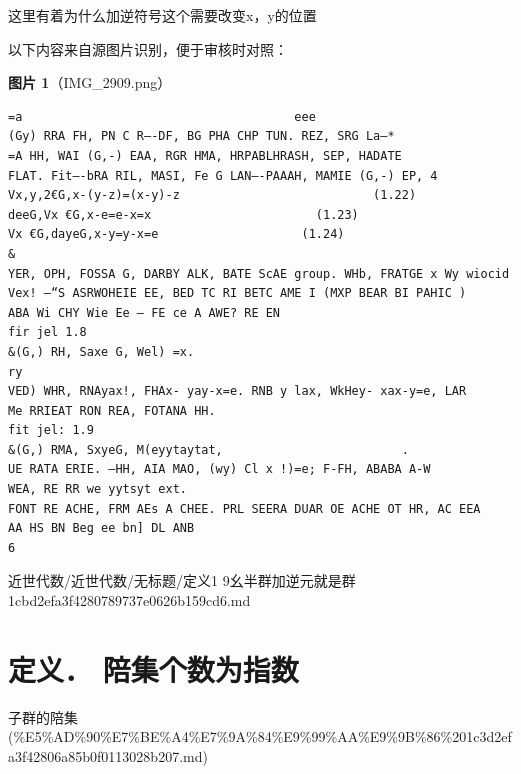 \begin{definition}[定义1.9幺半群加逆元就是群]

这里有着为什么加逆符号这个需要改变x，y的位置

\end{definition}

\begin{note}
以下内容来自源图片识别，便于审核时对照：

\textbf{图片 1}（IMG\_2909.png）
\begin{Verbatim}[fontsize=\small]
=a                                      eee
(Gy) RRA FH, PN C R—-DF, BG PHA CHP TUN. REZ, SRG La—*
=A HH, WAI (G,-) EAA, RGR HMA, HRPABLHRASH, SEP, HADATE
FLAT. Fit—-bRA RIL, MASI, Fe G LAN—-PAAAH, MAMIE (G,-) EP, 4
Vx,y,2€G,x-(y-z)=(x-y)-z                           (1.22)
deeG,Vx €G,x-e=e-x=x                       (1.23)
Vx €G,dayeG,x-y=y-x=e                    (1.24)
&
YER, OPH, FOSSA G, DARBY ALK, BATE ScAE group. WHb, FRATGE x Wy wiocid
Vex! —“S ASRWOHEIE EE, BED TC RI BETC AME I (MXP BEAR BI PAHIC )
ABA Wi CHY Wie Ee — FE ce A AWE? RE EN
fir jel 1.8
&(G,) RH, Saxe G, Wel) =x.
ry
VED) WHR, RNAyax!, FHAx- yay-x=e. RNB y lax, WkHey- xax-y=e, LAR
Me RRIEAT RON REA, FOTANA HH.
fit jel: 1.9
&(G,) RMA, SxyeG, M(eyytaytat,                         .
UE RATA ERIE. —HH, AIA MAO, (wy) Cl x !)=e; F-FH, ABABA A-W
WEA, RE RR we yytsyt ext.
FONT RE ACHE, FRM AEs A CHEE. PRL SEERA DUAR OE ACHE OT HR, AC EEA
AA HS BN Beg ee bn] DL ANB
6
\end{Verbatim}

\end{note}

\begin{note}[来源路径]

近世代数/近世代数/无标题/定义1 9幺半群加逆元就是群 1cbd2efa3f4280789737e0626b159cd6.md

\end{note}

\section*{定义． 陪集个数为指数}

\begin{note}[来源上级主题]

子群的陪集 (\%E5\%AD\%90\%E7\%BE\%A4\%E7\%9A\%84\%E9\%99\%AA\%E9\%9B\%86\%201c3d2efa3f42806a85b0f0113028b207.md)

\end{note}

